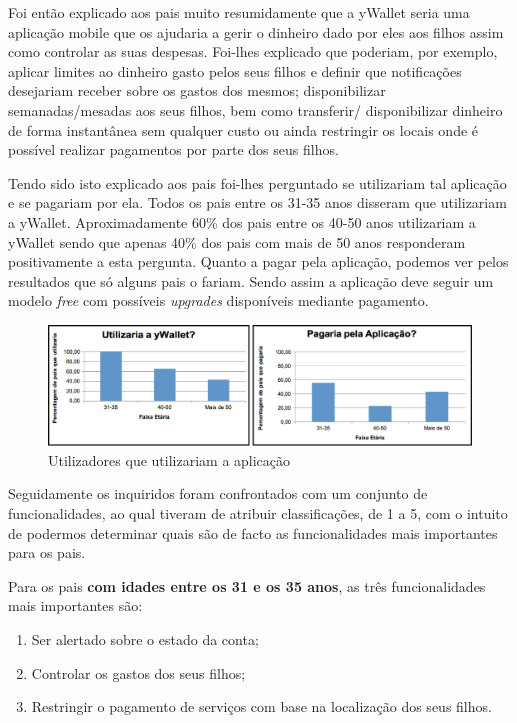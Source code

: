 \documentclass{article}
\begin{document}
      Foi então explicado aos pais muito resumidamente que a yWallet seria uma aplicação mobile que os ajudaria a gerir o dinheiro dado por eles aos filhos assim como controlar as suas despesas. Foi-lhes explicado que poderiam, por exemplo, aplicar limites ao dinheiro gasto pelos seus filhos e definir que notificações desejariam receber sobre os gastos dos mesmos; disponibilizar semanadas/mesadas aos seus filhos, bem como transferir/ disponibilizar dinheiro de forma instantânea sem qualquer custo ou ainda restringir os locais onde é possível realizar pagamentos por parte dos seus filhos. 

      Tendo sido isto explicado aos pais foi-lhes perguntado se utilizariam tal aplicação e se pagariam por ela. Todos os pais entre os 31-35 anos disseram que utilizariam a yWallet. Aproximadamente 60\% dos pais entre os 40-50 anos utilizariam a yWallet sendo que apenas 40\% dos pais com mais de 50 anos responderam positivamente a esta pergunta. Quanto a pagar pela aplicação, podemos ver pelos resultados que só alguns pais o fariam. Sendo assim a aplicação deve seguir um modelo \emph{free} com possíveis \emph{upgrades} disponíveis mediante pagamento.

      \begin{figure}[ht!]
        \centering
          \includegraphics[width=0.7\linewidth]{img/img11}
          \caption{Utilizadores que utilizariam a aplicação}
          \label{img11}
      \end{figure}

      Seguidamente os inquiridos foram confrontados com um conjunto de funcionalidades, ao qual tiveram de atribuir classificações, de 1 a 5, com o intuito de podermos determinar quais são de facto as funcionalidades mais importantes para os pais.

      Para os pais \textbf{com idades entre os 31 e os 35 anos}, as três funcionalidades mais importantes são:

      \begin{enumerate}
        \item Ser alertado sobre o estado da conta;
        \item Controlar os gastos dos seus filhos;
        \item Restringir o pagamento de serviços com base na localização dos seus filhos.
      \end{enumerate} 
\end{document}
